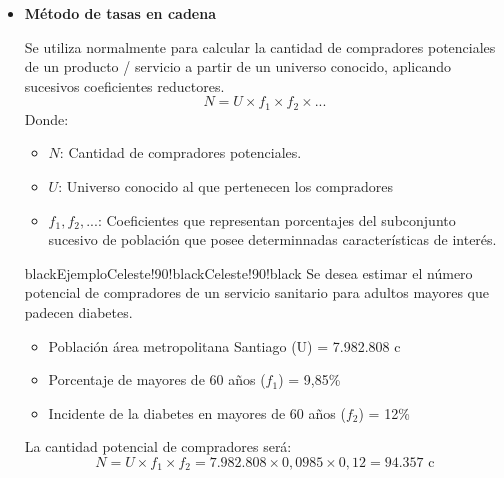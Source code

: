 \documentclass{templateNote}
\newcommand{\newparagraph}{\par\vspace{\baselineskip}\noindent}
\begin{document}
\begin{itemize}
  \newpage
  \item \textbf{Método de tasas en cadena}
  \newparagraph
  Se utiliza normalmente para calcular la cantidad de compradores potenciales de un producto / servicio a partir de un universo conocido, aplicando sucesivos coeficientes reductores.
  \begin{equation*}
    N = U \times f_1 \times f_2 \times ...
  \end{equation*}
  Donde:
  \begin{itemize}
    \item $N$: Cantidad de compradores potenciales.
    \item $U$: Universo conocido al que pertenecen los compradores
    \item $f_1, f_2, ...$: Coeficientes que representan porcentajes del subconjunto sucesivo de población que posee determinnadas características de interés.
  \end{itemize}
  \begin{CuadroPersonalizado}{black}{Ejemplo}{Celeste!90!black}{Celeste!90!black}
    Se desea estimar el número potencial de compradores de un servicio sanitario para adultos mayores que padecen diabetes.
    \begin{itemize}
      \item Población área metropolitana Santiago (U) = 7.982.808 c
      \item Porcentaje de mayores de 60 años ($f_1$) = 9,85\%
      \item Incidente de la diabetes en mayores de 60 años ($f_2$) = 12\%
    \end{itemize}
    La cantidad potencial de compradores será:
    \begin{equation*}
       N = U \times f_1 \times f_2 = 7.982.808 \times 0,0985 \times 0,12 = 94.357 \text{ c}
    \end{equation*}
  \end{CuadroPersonalizado}


\end{itemize}
\end{document}
